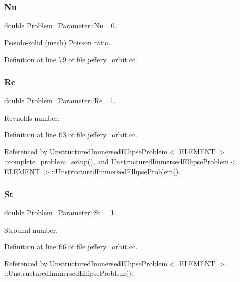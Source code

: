 \subsubsection{\texorpdfstring{Nu}{Nu}}
{\footnotesize\ttfamily double Problem\+\_\+\+Parameter\+::\+Nu =0.}



Pseudo-\/solid (mesh) Poisson ratio. 



Definition at line 79 of file jeffery\+\_\+orbit.\+cc.

\mbox{\label{namespaceProblem__Parameter_acc656299287d4d9a8374c2c501750b4f}} 
\subsubsection{\texorpdfstring{Re}{Re}}
{\footnotesize\ttfamily double Problem\+\_\+\+Parameter\+::\+Re =1.}



Reynolds number. 



Definition at line 63 of file jeffery\+\_\+orbit.\+cc.



Referenced by Unstructured\+Immersed\+Ellipse\+Problem$<$ E\+L\+E\+M\+E\+N\+T $>$\+::complete\+\_\+problem\+\_\+setup(), and Unstructured\+Immersed\+Ellipse\+Problem$<$ E\+L\+E\+M\+E\+N\+T $>$\+::\+Unstructured\+Immersed\+Ellipse\+Problem().

\mbox{\label{namespaceProblem__Parameter_a8d9b76e390569bac0095bd0952281a30}} 
\subsubsection{\texorpdfstring{St}{St}}
{\footnotesize\ttfamily double Problem\+\_\+\+Parameter\+::\+St = 1.}



Strouhal number. 



Definition at line 66 of file jeffery\+\_\+orbit.\+cc.



Referenced by Unstructured\+Immersed\+Ellipse\+Problem$<$ E\+L\+E\+M\+E\+N\+T $>$\+::\+Unstructured\+Immersed\+Ellipse\+Problem().

